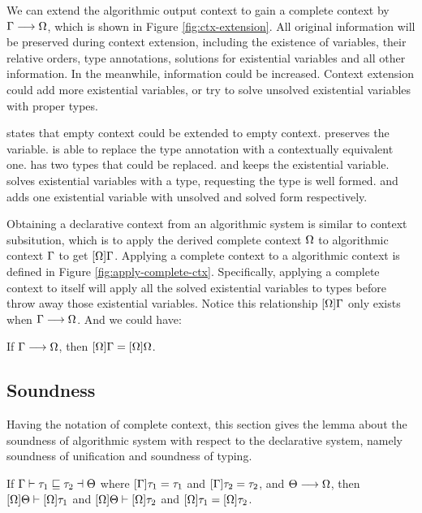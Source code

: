 We can extend the algorithmic output context to gain a complete context by $\Gamma \longrightarrow \Omega$, which is shown in Figure \ref{fig:ctx-extension}. All original information will be preserved during context extension, including the existence of variables, their relative orders, type annotations, solutions for existential variables and all other information. In the meanwhile, information could be increased. Context extension could add more existential variables, or try to solve unsolved existential variables with proper types.

 states that empty context could be extended to empty context.  preserves the variable.  is able to replace the type annotation with a contextually equivalent one.  has two types that could be replaced.  and  keeps the existential variable.  solves existential variables with a type, requesting the type is well formed.  and  adds one existential variable with unsolved and solved form respectively.

Obtaining a declarative context from an algorithmic system is similar to context subsitution, which is to apply the derived complete context $\Omega$ to algorithmic context $\Gamma$ to get $[\Omega]\Gamma$. Applying a complete context to a algorithmic context is defined in Figure \ref{fig:apply-complete-ctx}. Specifically, applying a complete context to itself will apply all the solved existential variables to types before throw away those existential variables. Notice this relationship $[\Omega]\Gamma$ only exists when $\Gamma \longrightarrow \Omega$. And we could have:

\begin{lemma}
  \label{lemma:stability-of-complete-context}

  If $\Gamma \longrightarrow \Omega$, then $[\Omega]\Gamma = [\Omega]\Omega$.
\end{lemma}

\subsection{Soundness}

Having the notation of complete context, this section gives the lemma about the soundness of algorithmic system with respect to the declarative system, namely soundness of unification and soundness of typing.

\begin{theorem}

If $\Gamma \vdash \tau_1 \sqsubseteq \tau_2 \dashv \Theta$ where $[\Gamma] \tau_1 = \tau_1$ and $[\Gamma] \tau_2 = \tau_2$,
and $\Theta \longrightarrow \Omega$,
then $[\Omega]\Theta \vdash [\Omega]\tau_1$ and $[\Omega]\Theta \vdash [\Omega]\tau_2$ and $[\Omega]\tau_1 = [\Omega]\tau_2$.
\end{theorem}

